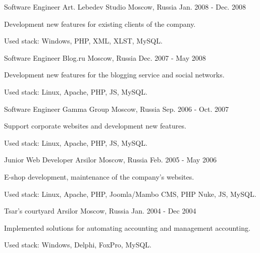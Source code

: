 \begin{cventries}
  \cventry
    {Software Engineer}
    {Art. Lebedev Studio}
    {Moscow, Russia}
    {Jan. 2008 - Dec. 2008}
    {
      \begin{cvitems}
        \item {Development new features for existing clients of the company.}
        \item {Used stack: Windows, PHP, XML, XLST, MySQL.}
      \end{cvitems}
    }

  \cventry
    {Software Engineer}
    {Blog.ru}
    {Moscow, Russia}
    {Dec. 2007 - May 2008}
    {
      \begin{cvitems}
        \item {Development new features for the blogging service and social networks.}
        \item {Used stack: Linux, Apache, PHP, JS, MySQL.}
      \end{cvitems}
    }

  \cventry
    {Software Engineer}
    {Gamma Group}
    {Moscow, Russia}
    {Sep. 2006 - Oct. 2007}
    {
      \begin{cvitems}
        \item {Support corporate websites and development new features.}
        \item {Used stack: Linux, Apache, PHP, JS, MySQL.}
      \end{cvitems}
    }

  \cventry
    {Junior Web Developer}
    {Arsilor}
    {Moscow, Russia}
    {Feb. 2005 - May 2006}
    {
      \begin{cvitems}
        \item {E-shop development, maintenance of the company's websites.}
        \item {Used stack: Linux, Apache, PHP, Joomla/Mambo CMS, PHP Nuke, JS, MySQL.}
      \end{cvitems}
    }

  \cventry
    {Tsar's courtyard}
    {Arsilor}
    {Moscow, Russia}
    {Jan. 2004 - Dec 2004}
    {
      \begin{cvitems}
        \item {Implemented solutions for automating accounting and management accounting.}
        \item {Used stack: Windows, Delphi, FoxPro, MySQL.}
      \end{cvitems}
    }

\end{cventries}
